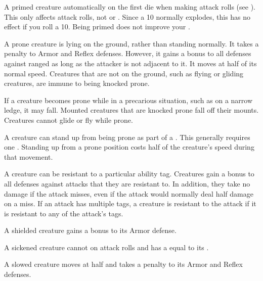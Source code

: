    A primed creature automatically  on the first die when making attack rolls (see ).
  This only affects attack rolls, not  or .
  Since a 10 normally explodes, this has no effect if you roll a 10.
  Being primed does not improve your .

   A prone creature is lying on the ground, rather than standing normally.
  It takes a  penalty to Armor and Reflex defenses.
  However, it gains a  bonus to all defenses against ranged  as long as the attacker is not adjacent to it.
  It moves at half of its normal speed.
  Creatures that are not on the ground, such as flying or gliding creatures, are immune to being knocked prone.

  If a creature becomes prone while in a precarious situation, such as on a narrow ledge, it may fall.
  Mounted creatures that are knocked prone fall off their mounts.
  Creatures cannot glide or fly while prone.

  A creature can stand up from being prone as part of a .
  This generally requires one .
  Standing up from a prone position costs half of the creature's speed during that movement.

  A creature can be resistant to a particular ability tag.
  Creatures gain a  bonus to all defenses against attacks that they are resistant to.
  In addition, they take no damage if the attack misses, even if the attack would normally deal half damage on a miss.
  If an attack has multiple tags, a creature is resistant to the attack if it is resistant to any of the attack's tags.

   A shielded creature gains a  bonus to its Armor defense.

   A sickened creature cannot  on attack rolls and has a  equal to its .

   A slowed creature moves at half  and takes a  penalty to its Armor and Reflex defenses.

